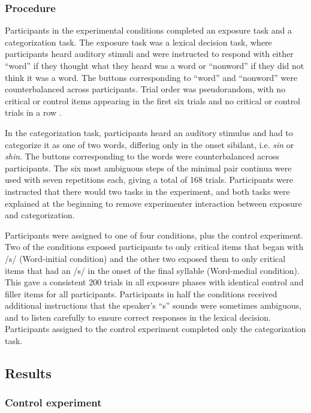 \subsubsection{Procedure}

Participants in the experimental conditions completed an exposure task and a categorization task.  
The exposure task was a lexical decision task, where participants heard auditory stimuli and were instructed to respond with either ``word'' if they thought what they heard was a word or ``nonword'' if they did not think it was a word.  
The buttons corresponding to ``word'' and ``nonword'' were counterbalanced across participants. Trial order was pseudorandom, with no critical or control items appearing in the first six trials and no critical or control trials in a row \citep[following][]{Reinisch2013}.

In the categorization task, participants heard an auditory stimulus and had to categorize it as one of two words, differing only in the onset sibilant, i.e. \emph{sin} or \emph{shin}.  
The buttons corresponding to the words were counterbalanced across participants.  
The six most ambiguous steps of the minimal pair continua were used with seven repetitions each, giving a total of 168 trials.
Participants were instructed that there would two tasks in the experiment, and both tasks were explained at the beginning to remove experimenter interaction between exposure and categorization.  

Participants were assigned to one of four conditions, plus the control experiment. 
Two of the conditions exposed participants to only critical items that began with /s/ (Word-initial condition) and the other two exposed them to only critical items that had an /s/ in the onset of the final syllable (Word-medial condition).
This gave a consistent 200 trials in all exposure phases with identical control and filler items for all participants. 
Participants in half the conditions received additional instructions that the speaker's ``s'' sounds were sometimes ambiguous, and to listen carefully to ensure correct responses in the lexical decision.
Participants assigned to the control experiment completed only the categorization task.

\subsection{Results}

\subsubsection{Control experiment}

